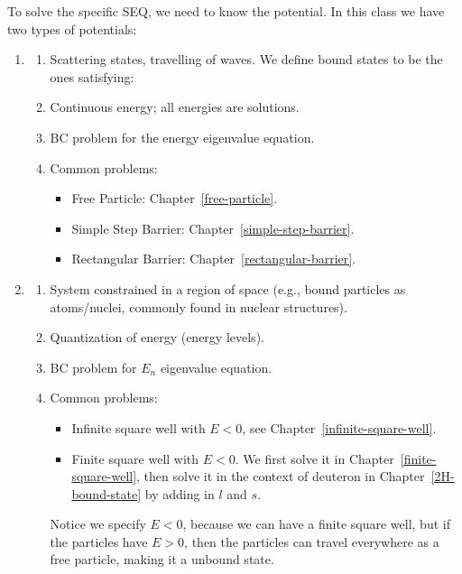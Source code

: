 \documentclass{school-22.101-notes}
\begin{document}
To solve the specific SEQ, we need to know the potential. In this class we have two types of potentials:
\begin{enumerate}
\item {}
  \begin{enumerate}
  \item Scattering states, travelling of waves.  We define bound states to be the ones satisfying:
  \item Continuous energy; all energies are solutions. 
  \item BC problem for the energy eigenvalue equation. 
  \item Common problems:
    \begin{itemize}
    \item Free Particle: Chapter~\ref{free-particle}.
    \item Simple Step Barrier: Chapter~\ref{simple-step-barrier}.
    \item Rectangular Barrier: Chapter~\ref{rectangular-barrier}.
    \end{itemize}
  \end{enumerate}

  \item {}
    \begin{enumerate}
      \item System constrained in a region of space (e.g., bound particles as atoms/nuclei, commonly found in nuclear structures). 
      \item Quantization of energy (energy levels).
      \item BC problem for $E_n$ eigenvalue equation. 
      \item Common problems: 
        \begin{itemize}
        \item Infinite square well with $E<0$, see Chapter~\ref{infinite-square-well}. 
        \item Finite square well with $E<0$. We first solve it in Chapter~\ref{finite-square-well}, then solve it in the context of deuteron in Chapter~\ref{2H-bound-state} by adding in $l$ and $s$.
        \end{itemize}
        Notice we specify $E<0$, because we can have a finite square well, but if the particles have $E>0$, then the particles can travel everywhere as a free particle, making it a unbound state. 
    \end{enumerate}
\end{enumerate}
\end{document}
